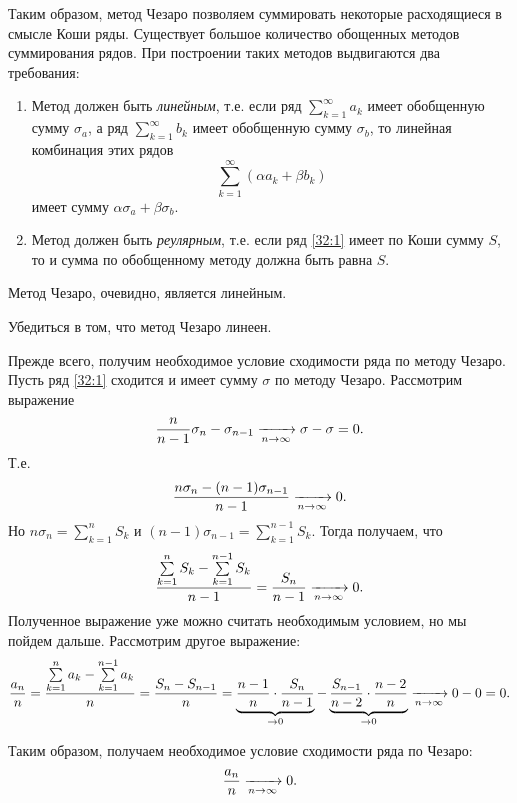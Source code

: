 \documentclass[../../main.tex]{subfiles}
\begin{document}
Таким образом, метод Чезаро позволяем суммировать некоторые расходящиеся в смысле Коши ряды. Существует большое количество обощенных методов суммирования рядов. При построении таких методов выдвигаются два требования:
\begin{enumerate}
 \item Метод должен быть \emph{линейным}, т.е. если ряд $\sum\limits_{k=1}^\infty a_k$ имеет обобщенную сумму $\sigma_a$, а ряд $\sum\limits_{k=1}^\infty b_k$ имеет обобщенную сумму $\sigma_b$, то линейная комбинация этих рядов \[\sum\limits_{k=1}^\infty (\alpha a_k + \beta b_k)\] имеет сумму $\alpha\sigma_a + \beta\sigma_b$.
 \item Метод должен быть \emph{реулярным}, т.е. если ряд \eqref{32:1} имеет по Коши сумму $S$, то и сумма по обобщенному методу должна быть равна $S$.
\end{enumerate}

Метод Чезаро, очевидно, является линейным.

\begin{exc}
 Убедиться в том, что метод Чезаро линеен.
\end{exc}

Прежде всего, получим необходимое условие сходимости ряда по методу Чезаро. Пусть ряд \eqref{32:1} сходится и имеет сумму $\sigma$ по методу Чезаро. Рассмотрим выражение
\[\frac{n}{n-1}\sigma_n - \sigma_{n-1} \xrightarrow[n\to\infty]{} \sigma - \sigma = 0.\] Т.е. \[\frac{n\sigma_n - (n-1)\sigma_{n-1}}{n-1} \xrightarrow[n\to\infty]{} 0.\] Но $n\sigma_n = \sum\limits_{k=1}^n S_k$ и $(n-1)\sigma_{n-1} = \sum\limits_{k=1}^{n-1} S_k$. Тогда получаем, что
\[\frac{\sum\limits_{k=1}^n S_k - \sum\limits_{k=1}^{n-1} S_k}{n-1} = \frac{S_n}{n-1} \xrightarrow[n\to\infty]{} 0.\]
Полученное выражение уже можно считать необходимым условием, но мы пойдем дальше. Рассмотрим другое выражение: \[\frac{a_n}n = \frac{\sum\limits_{k=1}^n a_k - \sum\limits_{k=1}^{n-1} a_k}n = \frac{S_n - S_{n-1}}n  = \underbrace{\frac{n-1}n\cdot\frac{S_n}{n-1}}_{\to0} - \underbrace{\frac{S_{n-1}}{n-2}\cdot\frac{n-2}n}_{\to0} \xrightarrow[n\to\infty]{} 0-0 = 0.\]

Таким образом, получаем необходимое условие сходимости ряда по Чезаро: \[\frac{a_n}n \xrightarrow[n\to\infty]{} 0.\]
\end{document}
